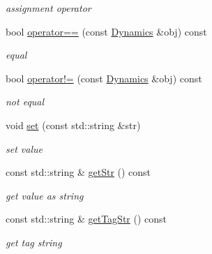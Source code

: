 \begin{DoxyCompactItemize}
\begin{DoxyCompactList}\small\item\em assignment operator \end{DoxyCompactList}\item 
\hypertarget{classsinsy_1_1Dynamics_a8fd4e333e8093696a6d37fca65135cb0}{bool \hyperlink{classsinsy_1_1Dynamics_a8fd4e333e8093696a6d37fca65135cb0}{operator==} (const \hyperlink{classsinsy_1_1Dynamics}{\-Dynamics} \&obj) const }\label{classsinsy_1_1Dynamics_a8fd4e333e8093696a6d37fca65135cb0}

\begin{DoxyCompactList}\small\item\em equal \end{DoxyCompactList}\item 
\hypertarget{classsinsy_1_1Dynamics_aace9f27288b754bd7f422a344f34e8b9}{bool \hyperlink{classsinsy_1_1Dynamics_aace9f27288b754bd7f422a344f34e8b9}{operator!=} (const \hyperlink{classsinsy_1_1Dynamics}{\-Dynamics} \&obj) const }\label{classsinsy_1_1Dynamics_aace9f27288b754bd7f422a344f34e8b9}

\begin{DoxyCompactList}\small\item\em not equal \end{DoxyCompactList}\item 
\hypertarget{classsinsy_1_1Dynamics_aedf628f4d2eb7d1918e9089add6dd638}{void \hyperlink{classsinsy_1_1Dynamics_aedf628f4d2eb7d1918e9089add6dd638}{set} (const std\-::string \&str)}\label{classsinsy_1_1Dynamics_aedf628f4d2eb7d1918e9089add6dd638}

\begin{DoxyCompactList}\small\item\em set value \end{DoxyCompactList}\item 
const std\-::string \& \hyperlink{classsinsy_1_1Dynamics_a7c549d433aa07b81895609daf5d171f8}{get\-Str} () const 
\begin{DoxyCompactList}\small\item\em get value as string \end{DoxyCompactList}\item 
\hypertarget{classsinsy_1_1Dynamics_a0cf91e30967cfe0acb6e0fb1d2c7c596}{const std\-::string \& \hyperlink{classsinsy_1_1Dynamics_a0cf91e30967cfe0acb6e0fb1d2c7c596}{get\-Tag\-Str} () const }\label{classsinsy_1_1Dynamics_a0cf91e30967cfe0acb6e0fb1d2c7c596}

\begin{DoxyCompactList}\small\item\em get tag string \end{DoxyCompactList}\end{DoxyCompactItemize}
